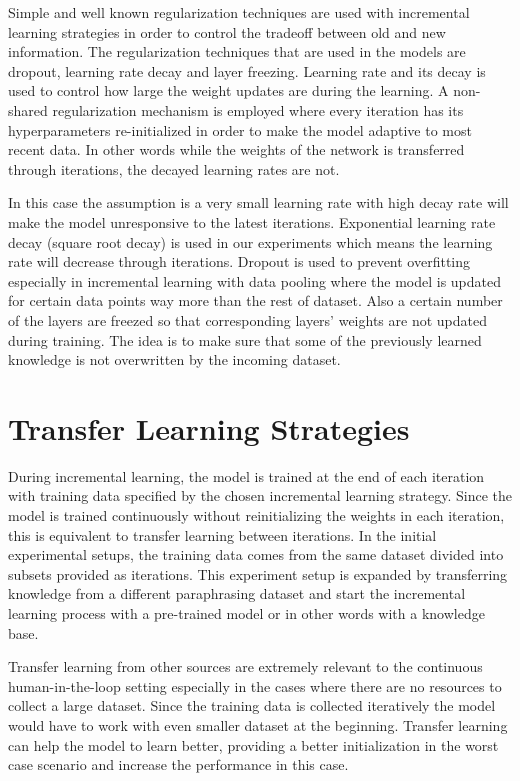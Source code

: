 Simple and well known regularization techniques are used with incremental learning strategies in order to control the tradeoff between old and new information. The regularization techniques that are used in the models are dropout, learning rate decay and layer freezing. Learning rate and its decay is used to control how large the weight updates are during the learning. A non-shared regularization mechanism is employed where every iteration has its hyperparameters re-initialized in order to make the model adaptive to most recent data. In other words while the weights of the network is transferred through iterations, the decayed learning rates are not.

In this case the assumption is a very small learning rate with high decay rate will make the model unresponsive to the latest iterations. Exponential learning rate decay (square root decay) is used in our experiments which means the learning rate will decrease through iterations. Dropout is used to prevent overfitting especially in incremental learning with data pooling where the model is updated for certain data points way more than the rest of dataset. Also a certain number of the layers are freezed so that corresponding layers' weights are not updated during training. The idea is to make sure that some of the previously learned knowledge is not overwritten by the incoming dataset. 

\section{Transfer Learning Strategies}

During incremental learning, the model is trained at the end of each iteration with training data specified by the chosen incremental learning strategy. Since the model is trained continuously without reinitializing the weights in each iteration, this is equivalent to transfer learning between iterations. In the initial experimental setups, the training data comes from the same dataset divided into subsets provided as iterations. This experiment setup is expanded by transferring knowledge from a different paraphrasing dataset and start the incremental learning process with a pre-trained model or in other words with a knowledge base. 

Transfer learning from other sources are extremely relevant to the continuous human-in-the-loop setting especially in the cases where there are no resources to collect a large dataset. Since the training data is collected iteratively the model would have to work with even smaller dataset at the beginning. Transfer learning can help the model to learn better, providing a better initialization in the worst case scenario and increase the performance in this case. 

